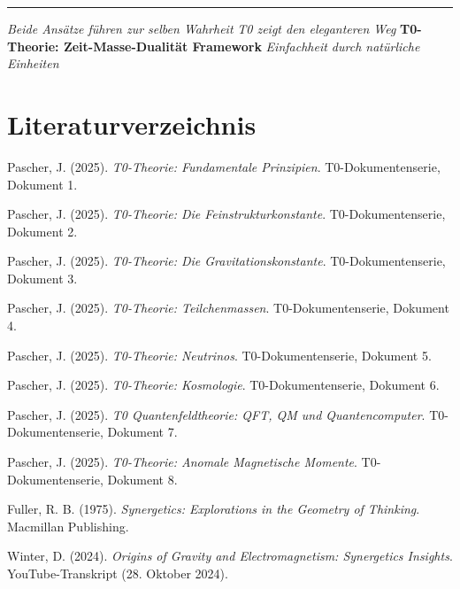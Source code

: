 \documentclass[12pt,a4paper]{article}
\begin{document}
	\vfill
	
	\begin{center}
		\hrule
		\vspace{0.5cm}
		\textit{Beide Ansätze führen zur selben Wahrheit}
		\textit{T0 zeigt den eleganteren Weg}
		\vspace{0.3cm}
		\textbf{T0-Theorie: Zeit-Masse-Dualität Framework}
		\textit{Einfachheit durch natürliche Einheiten}
		\vspace{0.3cm}
	\end{center}
	
	\section{Literaturverzeichnis}
	
	\begin{thebibliography}{20}
	
	Pascher, J. (2025). 
	\textit{T0-Theorie: Fundamentale Prinzipien}. 
	T0-Dokumentenserie, Dokument 1.
	
	Pascher, J. (2025). 
	\textit{T0-Theorie: Die Feinstrukturkonstante}. 
	T0-Dokumentenserie, Dokument 2.
	
	Pascher, J. (2025). 
	\textit{T0-Theorie: Die Gravitationskonstante}. 
	T0-Dokumentenserie, Dokument 3.
	
	Pascher, J. (2025). 
	\textit{T0-Theorie: Teilchenmassen}. 
	T0-Dokumentenserie, Dokument 4.
	
	Pascher, J. (2025). 
	\textit{T0-Theorie: Neutrinos}. 
	T0-Dokumentenserie, Dokument 5.
	
	Pascher, J. (2025). 
	\textit{T0-Theorie: Kosmologie}. 
	T0-Dokumentenserie, Dokument 6.
	
	Pascher, J. (2025). 
	\textit{T0 Quantenfeldtheorie: QFT, QM und Quantencomputer}. 
	T0-Dokumentenserie, Dokument 7.
	
	Pascher, J. (2025). 
	\textit{T0-Theorie: Anomale Magnetische Momente}. 
	T0-Dokumentenserie, Dokument 8.
	
	Fuller, R. B. (1975). 
	\textit{Synergetics: Explorations in the Geometry of Thinking}. 
	Macmillan Publishing.
	
	Winter, D. (2024). 
	\textit{Origins of Gravity and Electromagnetism: Synergetics Insights}. 
	YouTube-Transkript (28. Oktober 2024).
	

\end{thebibliography}
\end{document}
